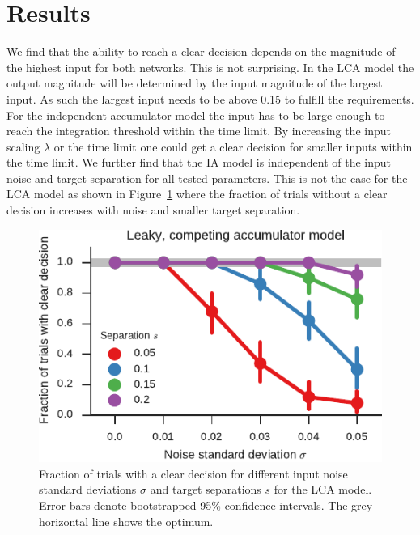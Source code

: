 \documentclass[10pt,letterpaper]{article}
\begin{document}
\section{Results}
We find that the ability to reach a clear decision depends on the magnitude of the highest input for both networks.
This is not surprising.
In the LCA model the output magnitude will be determined by the input magnitude of the largest input.
As such the largest input needs to be above 0.15 to fulfill the requirements.
For the independent accumulator model the input has to be large enough to reach the integration threshold within the time limit.
By increasing the input scaling $\lambda$ or the time limit one could get a clear decision for smaller inputs within the time limit.
We further find that the IA model is independent of the input noise and target separation for all tested parameters.
This is not the case for the LCA model as shown in Figure~\ref{fig:decisions} 
where the fraction of trials without a clear decision increases with noise and smaller target separation.
\begin{figure}
    \centering
    \includegraphics{figures/decisions}
    \caption{Fraction of trials with a clear decision for different input noise 
        standard deviations $\sigma$ and target separations $s$ for the LCA 
        model. Error bars denote bootstrapped 95\% confidence intervals.  The 
        grey horizontal line shows the optimum.}\label{fig:decisions}
\end{figure}
\end{document}
